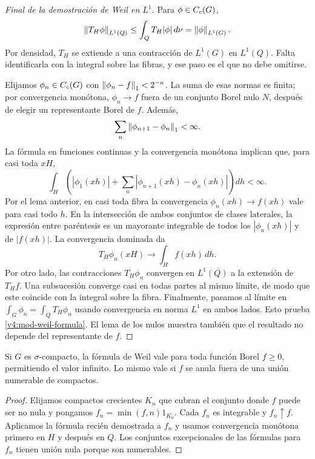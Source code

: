\begin{proof}[Final de la demostración de Weil en $L^1$]
Para $\phi\in C_c(G)$,
\[
 \left\lVert T_H\phi\right\rVert_{L^1(Q)}\leq\int_QT_H|\phi|\,d\nu
       =\left\lVert\phi\right\rVert_{L^1(G)}.
\]
Por densidad, $T_H$ se extiende a una contracción de $L^1(G)$ en $L^1(Q)$. Falta identificarla con la integral sobre las fibras, y ese paso es el que no debe omitirse.

Elijamos $\phi_n\in C_c(G)$ con $\left\lVert\phi_n-f\right\rVert_1<2^{-n}$. La suma de esas normas es finita; por convergencia monótona, $\phi_n\to f$ fuera de un conjunto Borel nulo $N$, después de elegir un representante Borel de $f$. Además,
\[
 \sum_n\left\lVert\phi_{n+1}-\phi_n\right\rVert_1<\infty.
\]
La fórmula en funciones continuas y la convergencia monótona implican que, para casi toda $xH$,
\[
 \int_H\left(|\phi_1(xh)|+
          \sum_n|\phi_{n+1}(xh)-\phi_n(xh)|\right)dh<\infty.
\]
Por el lema anterior, en casi toda fibra la convergencia $\phi_n(xh)\to f(xh)$ vale para casi todo $h$. En la intersección de ambos conjuntos de clases laterales, la expresión entre paréntesis es un mayorante integrable de todos los $|\phi_n(xh)|$ y de $|f(xh)|$. La convergencia dominada da
\[
 T_H\phi_n(xH)\longrightarrow\int_H f(xh)\,dh.
\]
Por otro lado, las contracciones $T_H\phi_n$ convergen en $L^1(Q)$ a la extensión de $T_Hf$. Una subsucesión converge casi en todas partes al mismo límite, de modo que este coincide con la integral sobre la fibra. Finalmente, pasamos al límite en $\int_G\phi_n=\int_QT_H\phi_n$ usando convergencia en norma $L^1$ en ambos lados. Esto prueba \eqref{v4:mod-weil-formula}. El lema de los nulos muestra también que el resultado no depende del representante de $f$.
\end{proof}

\begin{corolario}\label{v4:mod-weil-positivo}
Si $G$ es $\sigma$-compacto, la fórmula de Weil vale para toda función Borel $f\geq0$, permitiendo el valor infinito. Lo mismo vale si $f$ se anula fuera de una unión numerable de compactos.
\end{corolario}
\begin{proof}
Elijamos compactos crecientes $K_n$ que cubran el conjunto donde $f$ puede ser no nula y pongamos $f_n=\min(f,n)1_{K_n}$. Cada $f_n$ es integrable y $f_n\uparrow f$. Aplicamos la fórmula recién demostrada a $f_n$ y usamos convergencia monótona primero en $H$ y después en $Q$. Los conjuntos excepcionales de las fórmulas para $f_n$ tienen unión nula porque son numerables.
\end{proof}

